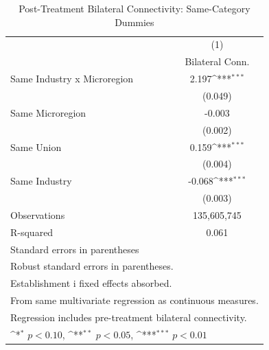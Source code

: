 \begin{table}[htbp]\centering
\def\sym#1{\ifmmode^{#1}\else\(^{#1}\)\fi}
\caption{Post-Treatment Bilateral Connectivity: Same-Category Dummies}
\begin{tabular}{l*{1}{c}}
\toprule
                    &\multicolumn{1}{c}{(1)}\\
                    &\multicolumn{1}{c}{Bilateral Conn.}\\
\midrule
Same Industry x Microregion&       2.197\sym{***}\\
                    &     (0.049)         \\
\addlinespace
Same Microregion    &      -0.003         \\
                    &     (0.002)         \\
\addlinespace
Same Union          &       0.159\sym{***}\\
                    &     (0.004)         \\
\addlinespace
Same Industry       &      -0.068\sym{***}\\
                    &     (0.003)         \\
\midrule
Observations        & 135,605,745         \\
R-squared           &       0.061         \\
\bottomrule
\multicolumn{2}{l}{\footnotesize Standard errors in parentheses}\\
\multicolumn{2}{l}{\footnotesize Robust standard errors in parentheses.}\\
\multicolumn{2}{l}{\footnotesize Establishment i fixed effects absorbed.}\\
\multicolumn{2}{l}{\footnotesize From same multivariate regression as continuous measures.}\\
\multicolumn{2}{l}{\footnotesize Regression includes pre-treatment bilateral connectivity.}\\
\multicolumn{2}{l}{\footnotesize \sym{*} \(p<0.10\), \sym{**} \(p<0.05\), \sym{***} \(p<0.01\)}\\
\end{tabular}
\end{table}
